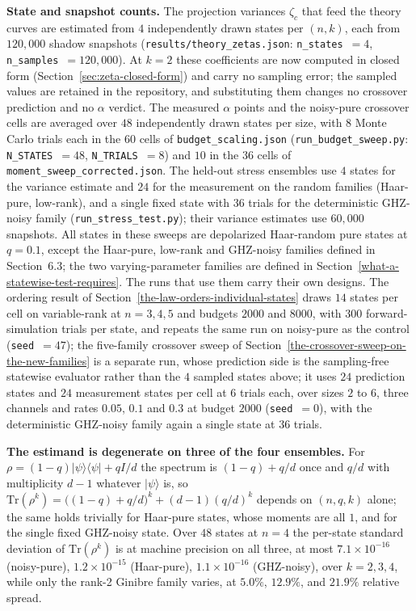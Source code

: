 \documentclass[a4paper,superscriptaddress,nofootinbib,onecolumn,nopdfoutputerror]{quantumarticle}
\begin{document}
\textbf{State and snapshot counts.} The projection variances
\(\zeta_c\) that feed the theory curves are estimated from \(4\)
independently drawn states per \((n, k)\), each from \(120{,}000\) shadow
snapshots (\texttt{results/\allowbreak theory\_zetas.json}: \texttt{n\_states}~\(=4\),
\texttt{n\_samples}~\(=120{,}000\)). At \(k = 2\) these coefficients are
now computed in closed form (Section~\ref{sec:zeta-closed-form}) and carry
no sampling error; the sampled values are retained in the repository, and
substituting them changes no crossover prediction and no \(\alpha\)
verdict. The measured \(\alpha\) points and the
noisy-pure crossover cells are averaged over \(48\) independently drawn
states per size, with \(8\) Monte Carlo trials each in the \(60\) cells of
\texttt{budget\_scaling.json} (\texttt{run\_budget\_sweep.py}:
\texttt{N\_STATES}~\(=48\), \texttt{N\_TRIALS}~\(=8\)) and \(10\) in the
\(36\) cells of
\texttt{moment\_\allowbreak sweep\_\allowbreak corrected.json}. The held-out stress ensembles use \(4\) states
for the variance estimate and \(24\) for the measurement on the random
families (Haar-pure, low-rank), and a single fixed state with \(36\) trials
for the deterministic GHZ-noisy family
(\texttt{run\_stress\_test.py}); their variance estimates use \(60{,}000\)
snapshots. All states in these sweeps are depolarized Haar-random pure states at \(q = 0.1\), except the
Haar-pure, low-rank and GHZ-noisy families defined in Section~6.3; the two varying-parameter
families are defined in Section~\ref{what-a-statewise-test-requires}. The runs that use them
carry their own designs. The ordering result of
Section~\ref{the-law-orders-individual-states} draws \(14\) states per cell on variable-rank at
\(n = 3, 4, 5\) and budgets \(2000\) and \(8000\), with \(300\) forward-simulation trials per
state, and repeats the same run on noisy-pure as the control (\texttt{seed}~\(=47\)); the five-family crossover sweep of
Section~\ref{the-crossover-sweep-on-the-new-families} is a separate run, whose prediction side is
the sampling-free statewise evaluator rather than the \(4\) sampled states above; it uses \(24\)
prediction states and \(24\) measurement states per cell at \(6\) trials each, over sizes \(2\) to \(6\), three channels and
rates \(0.05\), \(0.1\) and \(0.3\) at budget \(2000\) (\texttt{seed}~\(=0\)), with the
deterministic GHZ-noisy family again a single state at \(36\) trials.

\textbf{The estimand is degenerate on three of the four ensembles.} For
\(\rho = (1-q)\lvert\psi\rangle\langle\psi\rvert + q I/d\) the spectrum is
\((1-q) + q/d\) once and \(q/d\) with multiplicity \(d - 1\) whatever
\(\lvert\psi\rangle\) is, so
\(\mathrm{Tr}(\rho^k) = \bigl((1-q) + q/d\bigr)^k + (d-1)(q/d)^k\) depends
on \((n, q, k)\) alone; the same holds trivially for Haar-pure states,
whose moments are all \(1\), and for the single fixed GHZ-noisy state. Over \(48\) states at \(n = 4\) the
per-state standard deviation of \(\mathrm{Tr}(\rho^k)\) is at machine
precision on all three, at most \(7.1 \times 10^{-16}\) (noisy-pure),
\(1.2 \times 10^{-15}\) (Haar-pure), \(1.1 \times 10^{-16}\) (GHZ-noisy),
over \(k = 2, 3, 4\), while only the rank-2 Ginibre family varies, at
\(5.0\%\), \(12.9\%\), and \(21.9\%\) relative spread.
\end{document}
